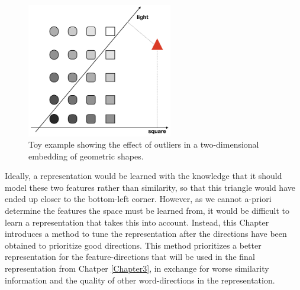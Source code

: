 

\begin{figure}
	\centering
	\includegraphics[width=180pt]{images/shapes}
	\caption{Toy example showing the effect of outliers in a two-dimensional embedding of geometric shapes.}
	\label{fig:toyExample}
\end{figure}

  
Ideally, a representation would be learned with the knowledge that it should model these two features rather than similarity, so that this triangle would have ended up closer to the bottom-left corner. However, as we cannot a-priori determine the features the space must be learned from, it would be difficult to learn a representation that takes this into account. Instead, this Chapter introduces a method to tune the representation after the directions have been obtained to prioritize good directions. This method prioritizes a better representation for the feature-directions that will be used in the final representation from Chatper \ref{Chapter3}, in exchange for worse similarity information and the quality of other word-directions in the representation.

